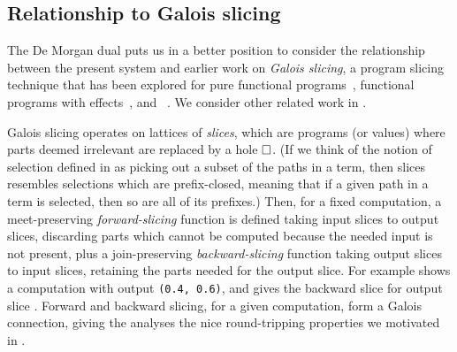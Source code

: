 \subsection{Relationship to Galois slicing}
\label{sec:de-morgan:galois-slicing}



The De Morgan dual puts us in a better position to consider the relationship between the present system and earlier work on \emph{Galois slicing}, a program slicing technique that has been explored for pure functional programs~\cite{perera12a}, functional programs with effects~\cite{ricciotti17}, and \piCalculus~\cite{perera16d}. We consider other related work in .

Galois slicing operates on lattices of \emph{slices}, which are programs (or values) where parts deemed irrelevant are replaced by a hole $\square$. (If we think of the notion of selection defined in  as picking out a subset of the paths in a term, then slices resembles selections which are prefix-closed, meaning that if a given path in a term is selected, then so are all of its prefixes.) Then, for a fixed computation, a meet-preserving \emph{forward-slicing} function is defined taking input slices to output slices, discarding parts which cannot be computed because the needed input is not present, plus a join-preserving \emph{backward-slicing} function taking output slices to input slices, retaining the parts needed for the output slice. For example  shows a computation with output \lstinline{(0.4, 0.6)}, and  gives the backward slice for output slice . Forward and backward slicing, for a given computation, form a Galois connection, giving the analyses the nice round-tripping properties we motivated in .

